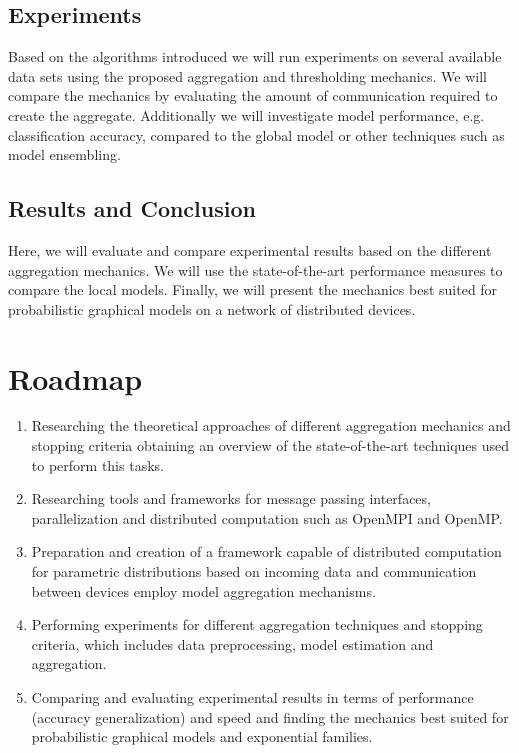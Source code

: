   \subsection{Experiments}
  Based on the algorithms introduced we will run experiments on several available data sets using the proposed aggregation and thresholding mechanics.
  We will compare the mechanics by evaluating the amount of communication required to create the aggregate. Additionally we will investigate model performance, e.g. classification accuracy, compared to the global model or other techniques such as model ensembling.

  \subsection{Results and Conclusion}
  Here, we will evaluate and compare experimental results based on the different aggregation mechanics. 
  We will use the state-of-the-art performance measures to compare the local models.
  Finally, we will present the mechanics best suited for probabilistic graphical models on a network of distributed devices.

  \section{Roadmap}
  \begin{enumerate}
       \item Researching the theoretical approaches of different aggregation mechanics and stopping criteria obtaining an overview of the state-of-the-art techniques used to perform this tasks.
       \item Researching tools and frameworks for message passing interfaces, parallelization and distributed computation such as OpenMPI\cite{gabriel04:_open_mpi} and OpenMP.
       \item Preparation and creation of a framework capable of distributed computation for parametric distributions based on incoming data and communication between devices employ model aggregation mechanisms.
       \item Performing experiments for different aggregation techniques and stopping criteria, which includes data preprocessing, model estimation and aggregation.
       \item Comparing and evaluating experimental results in terms of performance (accuracy generalization) and speed and finding the mechanics best suited for probabilistic graphical models and exponential families.
    \end{enumerate}